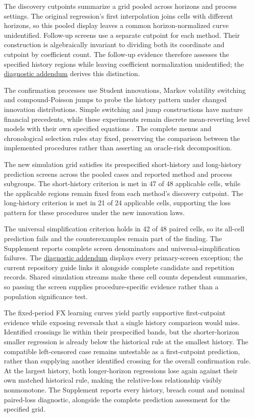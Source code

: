 \documentclass[11pt,a4paper]{article}
\begin{document}
The discovery cutpoints summarize a grid pooled across horizons and process settings. The original regression's first interpolation joins cells with different horizons, so this pooled display leaves a common horizon-normalized curve unidentified. Follow-up screens use a separate cutpoint for each method. Their construction is algebraically invariant to dividing both its coordinate and cutpoint by coefficient count. The follow-up evidence therefore assesses the specified history regions while leaving coefficient normalization unidentified; the \href{diagnostic-addendum.pdf}{diagnostic addendum} derives this distinction.

The confirmation processes use Student innovations, Markov volatility switching and compound-Poisson jumps to probe the history pattern under changed innovation distributions. Simple switching and jump constructions have mature financial precedents, while these experiments remain discrete mean-reverting level models with their own specified equations \citep{turner1989,merton1976}. The complete menus and chronological selection rules stay fixed, preserving the comparison between the implemented procedures rather than asserting an oracle-risk decomposition.

The new simulation grid satisfies its prespecified short-history and long-history prediction screens across the pooled cases and reported method and process subgroups. The short-history criterion is met in 47 of 48 applicable cells, while the applicable regions remain fixed from each method's discovery cutpoint. The long-history criterion is met in 21 of 24 applicable cells, supporting the loss pattern for these procedures under the new innovation laws.

The universal simplification criterion holds in 42 of 48 paired cells, so its all-cell prediction fails and the counterexamples remain part of the finding. The Supplement reports complete screen denominators and universal-simplification failures. The \href{diagnostic-addendum.pdf}{diagnostic addendum} displays every primary-screen exception; the current repository guide links it alongside complete candidate and repetition records. Shared simulation streams make these cell counts dependent summaries, so passing the screen supplies procedure-specific evidence rather than a population significance test.

The fixed-period FX learning curves yield partly supportive first-cutpoint evidence while exposing reversals that a single history comparison would miss. Identified crossings lie within their prespecified bands, but the shorter-horizon smaller regression is already below the historical rule at the smallest history. The compatible left-censored case remains untestable as a first-cutpoint prediction, rather than supplying another identified crossing for the overall confirmation rule. At the largest history, both longer-horizon regressions lose again against their own matched historical rule, making the relative-loss relationship visibly nonmonotone. The Supplement reports every history, breach count and nominal paired-loss diagnostic, alongside the complete prediction assessment for the specified grid.
\end{document}
